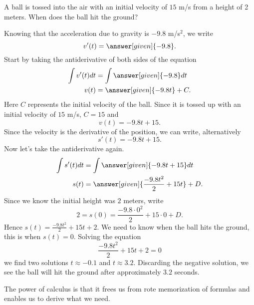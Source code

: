 \documentclass{ximera}
\begin{document}
\begin{example}
A ball is tossed into the air with an initial velocity of $15$ m/s
from a height of 2 meters. When does the ball hit the ground?
\begin{explanation}
Knowing that the acceleration due to gravity is $-9.8$ m/s$^2$, we write
\[
v'(t) = \answer[given]{-9.8}.
\]
Start by taking the antiderivative of both sides of the equation
\begin{align*}
\int v'(t) dt &= \int \answer[given]{-9.8} dt\\
v(t) &= \answer[given]{-9.8 t} + C.
\end{align*}
Here $C$ represents the initial velocity of the ball. Since it is
tossed up with an initial velocity of $15$ m/s, $C = 15$ and 
\[
v(t) = -9.8t + 15.
\]
Since the velocity is the derivative of the position, we can write, alternatively
\[
s'(t) = -9.8t + 15.
\]
Now let's take the antiderivative again. 
\begin{align*}
\int s'(t) dt &= \int \answer[given]{-9.8t +15} dt\\
s(t) &= \answer[given]{\frac{-9.8t^2}{2} + 15t} + D.
\end{align*}
Since we know the initial height was $2$ meters, write
\[
2 = s(0) =  \frac{-9.8\cdot 0^2}{2} + 15\cdot 0 + D.
\]
Hence $s(t) = \frac{-9.8t^2}{2} + 15t + 2$. We need to know when the
ball hits the ground, this is when $s(t)=0$. Solving the equation
\[
\frac{-9.8t^2}{2} + 15t + 2 = 0
\]
we find two solutions $t\approx -0.1$ and $t\approx 3.2$. Discarding
the negative solution, we see the ball will hit the ground after
approximately $3.2$ seconds.
\end{explanation}
\end{example}

The power of calculus is that it frees us from rote memorization of
formulas and enables us to derive what we need.
\end{document}
